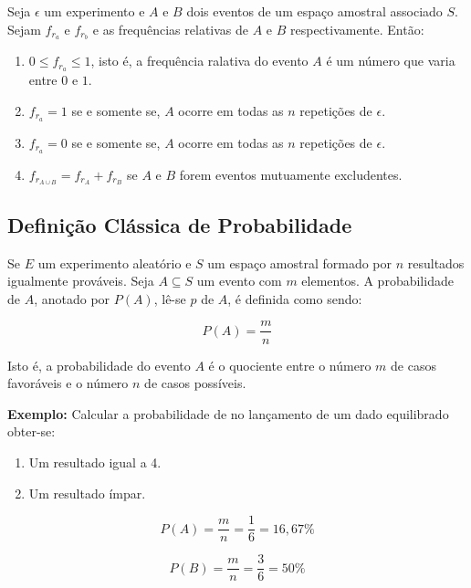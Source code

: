 \inic Seja $\epsilon$ um experimento e $A$ e $B$ dois eventos de um espaço amostral associado $S$. Sejam $f_{r_{a}}$ e $f_{r_{b}}$ e as frequências relativas de $A$ e $B$ respectivamente. Então:

\begin{enumerate}
    \item $0 \leqslant f_{r_{a}}  \leqslant 1$, isto é, a frequência ralativa do evento $A$ é um número que varia entre $0$ e $1$.
    \item $f_{r_{a}}= 1$ se e somente se, $A$ ocorre em todas as $n$ repetições de $\epsilon$.
    \item $f_{r_{a}}= 0$ se e somente se, $A$ ocorre em todas as $n$ repetições de $\epsilon$.
    \item $f_{r_{A \cup B}}  = f_{r_{A}} + f_{r_{B}}$ se $A$ e $B$ forem eventos mutuamente excludentes.
\end{enumerate}
 
 
 
 
 
\subsection{Definição Clássica de Probabilidade}
 
\inic Se $E$ um experimento aleatório e $S$ um espaço amostral formado por $n$ resultados igualmente prováveis. Seja $A \subseteq S$ um evento com $m$ elementos. A probabilidade de $A$, anotado por $P(A)$, lê-se $p$ de $A$, é definida como sendo:
  
\begin{equation}
     P(A)= \frac{m}{n}
\end{equation}
  
\inic Isto é, a probabilidade do evento $A$ é o quociente entre o número $m$ de casos favoráveis e o número $n$ de casos possíveis.\vskip0.3cm


\textbf{Exemplo:} Calcular a probabilidade de no lançamento de um
dado equilibrado obter-se:

\begin{enumerate}
    \item Um resultado igual a 4.
    \item Um resultado ímpar.
\end{enumerate}

$$
P(A)= \frac{m}{n}=\frac{1}{6}=16,67\%
$$

$$
P(B)= \frac{m}{n}=\frac{3}{6}=50\%
$$





